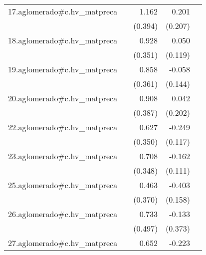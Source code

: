 {\begin{longtable}{l*{4}{D{.}{.}{-1}}}
\addlinespace
17.aglomerado#c.hv\_matpreca&                     &       1.162\sym{**} &       0.201         &                     \\
            &                     &     (0.394)         &     (0.207)         &                     \\
\addlinespace
18.aglomerado#c.hv\_matpreca&                     &       0.928\sym{**} &       0.050         &                     \\
            &                     &     (0.351)         &     (0.119)         &                     \\
\addlinespace
19.aglomerado#c.hv\_matpreca&                     &       0.858\sym{*}  &      -0.058         &                     \\
            &                     &     (0.361)         &     (0.144)         &                     \\
\addlinespace
20.aglomerado#c.hv\_matpreca&                     &       0.908\sym{*}  &       0.042         &                     \\
            &                     &     (0.387)         &     (0.202)         &                     \\
\addlinespace
22.aglomerado#c.hv\_matpreca&                     &       0.627         &      -0.249\sym{*}  &                     \\
            &                     &     (0.350)         &     (0.117)         &                     \\
\addlinespace
23.aglomerado#c.hv\_matpreca&                     &       0.708\sym{*}  &      -0.162         &                     \\
            &                     &     (0.348)         &     (0.111)         &                     \\
\addlinespace
25.aglomerado#c.hv\_matpreca&                     &       0.463         &      -0.403\sym{*}  &                     \\
            &                     &     (0.370)         &     (0.158)         &                     \\
\addlinespace
26.aglomerado#c.hv\_matpreca&                     &       0.733         &      -0.133         &                     \\
            &                     &     (0.497)         &     (0.373)         &                     \\
\addlinespace
27.aglomerado#c.hv\_matpreca&                     &       0.652         &      -0.223\sym{***}&                     \\

\end{longtable}}
